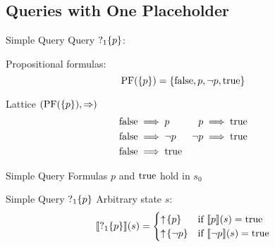 \subsection[One Placeholder]{Queries with One Placeholder}

%  
%  


\begin{frame}{Simple Query}
  Query  $\operatorname{?}_1\{p\}$:

  \vfill

  Propositional formulas:
  \[ \operatorname{PF}(\{p\}) = \{\operatorname{false}, p, \lnot p, \operatorname{true}\} \]
\end{frame}

\begin{frame}{Lattice $(\operatorname{PF}(\{p\}),\Rightarrow)$}
  \begin{align*}
    \operatorname{false} &\implies p & p &\implies \operatorname{true} \\
    \operatorname{false} &\implies \lnot p & \lnot p &\implies \operatorname{true} \\
    \operatorname{false} &\implies \operatorname{true} & &
  \end{align*}

  \vfill\pause

  \begin{center}
  \end{center}
\end{frame}

\begin{frame}{Simple Query}
  Formulas $p$ and $\operatorname{true}$ hold in $s_0$
  
  
\end{frame}

\begin{frame}{Simple Query $\operatorname{?}_1\{p\}$}
  Arbitrary state $s$:
  \[ \llbracket \operatorname{?}_1\{p\} \rrbracket (s) = \begin{cases}
       \uparrow \! \left\{ p \right\} & \text{if } \llbracket p \rrbracket (s) = \operatorname{true} \\
       \uparrow \! \left\{ \lnot p \right\} & \text{if } \llbracket \lnot p \rrbracket (s) = \operatorname{true} \\
     \end{cases} 
  \]
\end{frame}

